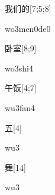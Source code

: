 \begin{verbete}[wo3men0de0]{我们的}[7;5;8]
\begin{pronuncia}{wo3men0de0}
\end{pronuncia}
\end{verbete}

\begin{verbete}[wo3shi4]{卧室}[8;9]
\begin{pronuncia}{wo3shi4}
\end{pronuncia}
\end{verbete}

\begin{verbete}[wu3fan4]{午饭}[4;7]
\begin{pronuncia}{wu3fan4}
\end{pronuncia}
\end{verbete}

\begin{verbete}[wu3]{五}[4]
\begin{pronuncia}{wu3}
\end{pronuncia}
\end{verbete}

\begin{verbete}[wu3]{舞}[14]
\begin{pronuncia}{wu3}
\end{pronuncia}
\end{verbete}

